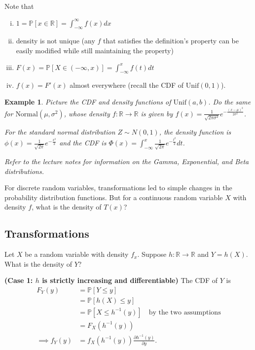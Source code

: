 \documentclass{tufte-handout}
\newcommand*\R{\mathbb{R}}
\renewcommand{\P}{\mathbb{P}}
\newtheorem{ex}[thm]{Example}
\theoremstyle{definition}
\begin{document}
Note that
\begin{enumerate}[(i)]
	\item $1 = \P\left[x \in \R\right] = \int_{-\infty}^{\infty} f(x)dx$
	\item density is not unique (any $f$ that satisfies the definition's property can be easily modified while still maintaining the property)
	\item $F(x) = \P\left[X \in (-\infty,x)\right] = \int_{-\infty}^{x} f(t)dt$
	\item $f(x) = F'(x)$ almost everywhere (recall the CDF of $\text{Unif}(0,1)$).
\end{enumerate}

\begin{ex}
	Picture the CDF and density functions of $\text{Unif}(a,b)$. Do the same for $\text{Normal}(\mu,\sigma^2)$, whose density $f: \R \to \R$ is given by $f(x) = \frac{1}{\sqrt{2\pi\sigma^2} }e^{-\frac{(x-\mu)^2}{2\sigma^2}}$.
	
	For the standard normal distribution $Z \sim N(0,1)$, the density function is $\phi(x) = \frac{1}{\sqrt{2\pi}}e^{-\frac{x^2}{2}}$ and the CDF is $\Phi(x) = \int_{-\infty}^{x} \frac{1}{\sqrt{2\pi} }e^{-\frac{t^2}{2}}dt$.

	Refer to the lecture notes for information on the Gamma, Exponential, and Beta distributions.
\end{ex}

For discrete random variables, transformations led to simple changes in the probability distribution functions. But for a continuous random variable $X$ with density $f$, what is the density of $T(x)$?


\subsection{Transformations}
Let $X$ be a random variable with density $f_x$. Suppose $h: \R \to \R$ and $Y = h(X)$. What is the density of $Y$?

\textbf{(Case 1: $h$ is strictly increasing and differentiable)} The CDF of $Y$ is 
\begin{align*}
	F_Y(y) &= \P[Y \le y] \\
	&= \P\left[h(X) \le y\right]  \\
	&= \P\left[X \le h^{-1}(y) \right] \quad \text{by the two assumptions} \\
	&= F_X(h^{-1}(y)) \\
	\implies f_Y(y) &= f_X(h^{-1}(y)) \frac{\partial h^{-1}(y)}{\partial y} 		
.\end{align*}
\end{document}
